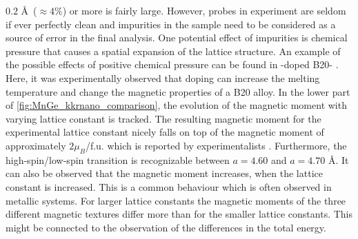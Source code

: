 \documentclass[graybox]{svmult}
\begin{document}
$0.2$ \AA \, ($\approx 4 \%$) or more is fairly large.
However, probes in experiment are seldom if ever perfectly clean and
impurities in the sample need to be considered as a source of error in the
final analysis. One potential
effect of impurities is chemical pressure that causes a spatial expansion of the
lattice structure.
An example of the possible effects of positive chemical pressure
can be found in -doped B20- \cite{stolt_chemical_2018}. 
Here, it was experimentally observed
that doping can increase the melting temperature and change the magnetic properties of a B20 alloy.
In the lower part of \cref{fig:MnGe_kkrnano_comparison}, the evolution of the magnetic moment
with varying lattice constant is tracked.
The resulting magnetic moment for the experimental lattice constant nicely falls 
on top of the magnetic moment of approximately $2 \mu_{B}$/f.u. 
which is reported by experimentalists \cite{yaouanc_magnetic_2017}.
Furthermore, the high-spin/low-spin transition is recognizable between $a=4.60$ and $a=4.70$ \AA.
It can also be observed that the magnetic moment increases, when the lattice constant is increased.
This is a common behaviour which is often observed in metallic systems.
For larger lattice constants the magnetic moments of the three different
magnetic textures differ more than for the smaller lattice constants.
This might be connected to the observation of the differences in the total energy.
\end{document}

